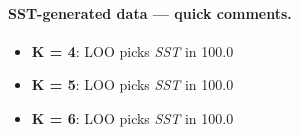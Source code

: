 \paragraph{SST-generated data — quick comments.}
\begin{itemize}
\item \textbf{K = 4}: LOO picks \emph{SST} in 100.0%
\item \textbf{K = 5}: LOO picks \emph{SST} in 100.0%
\item \textbf{K = 6}: LOO picks \emph{SST} in 100.0%
\end{itemize}

